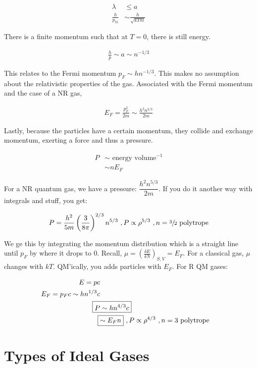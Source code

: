 \documentclass[10pt,letterpaper,final]{book}
\newcommand{\pt}{\propto}
\newcommand{\rp}{\right)}
\newcommand{\lp}{\left(}
\begin{document}
\begin{align}
\lambda &\leq a\\
\frac{h}{p_{th}} &\sim \frac{h}{\sqrt{kTm}}
\end{align}

There is a finite momentum such that at $T=0$, there is still energy.

\begin{align}
\frac{h}{p} \sim a \sim n^{-1/3}
\end{align}

This relates to the Fermi momentum $p_F \sim hn^{-1/3}$. This makes no assumption about the relativistic properties of the gas. Associated with the Fermi momentum and the case of a NR gas,

\begin{align}
E_F = \frac{p_F^2}{2m	} \sim \frac{h^2 n^{2/3}}{2m}
\end{align}

Lastly, because the particles have a certain momentum, they collide and exchange momentum, exerting a force and thus a pressure. 

\begin{align}
P &\sim \text{ energy volume}^{-1}\\
&\sim nE_F
\end{align}

For a NR quantum gas, we have a pressure: $\dfrac{h^2n^{5/3}}{2m}$. If you do it another way with integrals and stuff, you get: 

\begin{align}
P = \frac{h^2}{5m} \lp \frac{3}{8 \pi} \rp^{2/3} n^{5/3}~,P \pt \rho^{5/3}~,n=\sfrac{3}{2}\text{ polytrope}
\end{align}

We ge this by integrating the momentum distribution which is a straight line until $p_F$ by where it drops to 0. Recall, $\mu = \lp \frac{\delta E}{\delta N} \rp_{S,V} = E_F$. For a classical gas, $\mu$ changes with $kT$. QM'ically, you adds particles with $E_F$. For R QM gases:

\begin{align}
E = pc\\
E_F = p_F c\sim hn^{1/3}c\\
\Aboxed{P &\sim hn^{4/3}c}\\
\Aboxed{&\sim E_F n}~,P \pt \rho^{4/3}~,n=3\text{ polytrope}
\end{align}

\section{Types of Ideal Gases}
\end{document}
